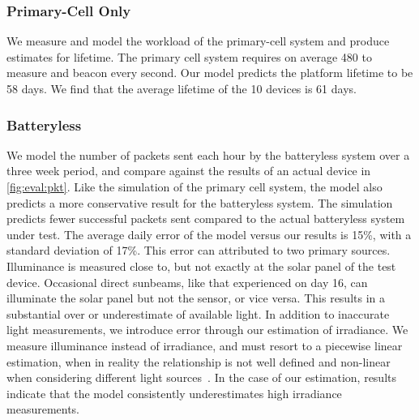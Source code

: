\subsubsection{Primary-Cell Only}
We measure and model the workload of the primary-cell system and produce estimates for
lifetime. The primary cell system requires on average 480\ssi{\micro\watt} to measure and beacon every second. Our model predicts the platform lifetime
to be 58 days.  We find that the average lifetime of the 10 devices is 61 days.

\subsubsection{Batteryless}
We model the number of packets sent each hour by the
batteryless system over a three week period, and compare against the results of an actual device in
\cref{fig:eval:pkt}.
Like the simulation of the primary cell system, the model also predicts a more conservative result for the batteryless system. 
The simulation predicts fewer successful packets sent compared to the actual batteryless system under test. 
The average daily error of the model versus our results is 15\%, with a standard deviation of
17\%. This error can attributed to two primary sources. Illuminance is measured
close to, but not exactly at the solar panel of the test device. Occasional
direct sunbeams, like that experienced on day 16, can illuminate the solar
panel but not the sensor, or vice versa. This
results in a substantial over or underestimate of available light. In addition
to inaccurate light measurements, we introduce error through our estimation of
irradiance. We measure illuminance
instead of irradiance, and must resort to a piecewise linear estimation, when
in reality the relationship is not well defined and non-linear when considering
different light sources~\cite{michael2020conversion}. In the case of our estimation, results
indicate that the model consistently underestimates high irradiance measurements.

